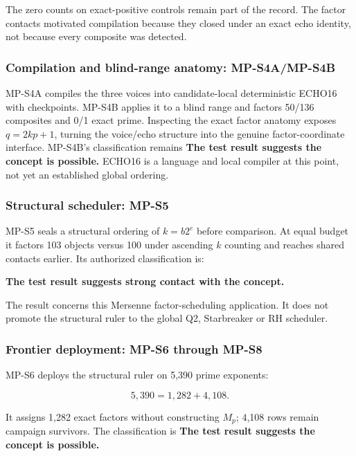 The zero counts on exact-positive controls remain part of the record.
The factor contacts motivated compilation because they closed under an
exact echo identity, not because every composite was detected.

\subsubsection{Compilation and blind-range anatomy:
MP-S4A/MP-S4B}\label{viii-ch10-compilation-and-blind-range-anatomy-mp-s4amp-s4b}

MP-S4A compiles the three voices into candidate-local deterministic
ECHO16 with checkpoints. MP-S4B applies it to a blind range and factors
50/136 composites and 0/1 exact prime. Inspecting the exact factor
anatomy exposes \(q=2kp+1\), turning the voice/echo structure into the
genuine factor-coordinate interface. MP-S4B's classification remains
\textbf{The test result suggests the concept is possible.} ECHO16 is a
language and local compiler at this point, not yet an established global
ordering.

\subsubsection{Structural scheduler:
MP-S5}\label{viii-ch10-structural-scheduler-mp-s5}

MP-S5 seals a structural ordering of \(k=b2^e\) before comparison. At
equal budget it factors 103 objects versus 100 under ascending \(k\)
counting and reaches shared contacts earlier. Its authorized
classification is:

\textbf{The test result suggests strong contact with the concept.}

The result concerns this Mersenne factor-scheduling application. It does
not promote the structural ruler to the global Q2, Starbreaker or RH
scheduler.

\subsubsection{Frontier deployment: MP-S6 through
MP-S8}\label{viii-ch10-frontier-deployment-mp-s6-through-mp-s8}

MP-S6 deploys the structural ruler on 5,390 prime exponents:

\[
5{,}390=1{,}282+4{,}108.
\]

It assigns 1,282 exact factors without constructing \(M_p\); 4,108 rows
remain campaign survivors. The classification is \textbf{The test result
suggests the concept is possible.}


